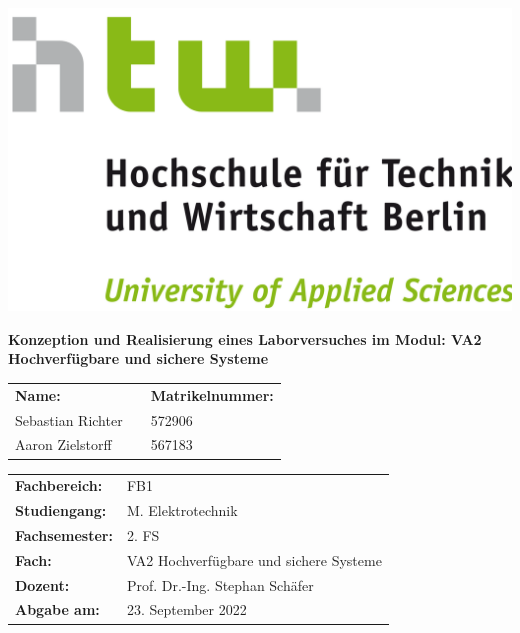 \documentclass[
	pagesize,
	fontsize=12pt,
	paper=a4,
	oneside,
   reqno
]{scrartcl}
\begin{document}
\begin{titlepage}
   \pagestyle{empty} %

   \begin{flushright}
   \includegraphics[scale=.07]{Bilder/LogoHTWBerlin.png}  \nocite{HTWgross}
   \end{flushright}

   \vspace{1cm}

   \begin{center}
      \Huge{\textbf{Konzeption und Realisierung eines Laborversuches im Modul:
VA2 Hochverfügbare und sichere Systeme}} \\
   \end{center}

   \vspace{3cm}

   \begin{flushleft}
      \begin{tabular}{l c l }
         \textbf{Name: }&\hspace{1 cm} &\textbf{Matrikelnummer:} \\
         Sebastian Richter  & & 572906 \\
         Aaron Zielstorff   & & 567183 \\
      \end{tabular}
   \end{flushleft}

   \vspace{1cm}

   \begin{tabular}{l l}
      \textbf{Fachbereich:}   & FB1                                                 \\
      \textbf{Studiengang:}   & M.\xspace Elektrotechnik                            \\
      \textbf{Fachsemester:}  & 2.\xspace FS                                        \\
      \textbf{Fach:}          & VA2 Hochverfügbare und sichere Systeme              \\
      \textbf{Dozent:}        & Prof.\xspace Dr.\xspace -Ing.\xspace Stephan Schäfer\\
      \textbf{Abgabe am:}     & 23.\xspace September 2022                           \\ 
   \end{tabular}
\end{titlepage}
\end{document}
